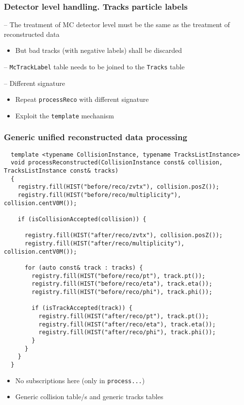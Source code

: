 \documentclass[14pt,aspectratio=169,t]{beamer}
\begin{document}
\begin{frame}[fragile]
  \frametitle{Detector level handling. Tracks particle labels}
  \vspace{0.1in}
  -- {\color{blue} The treatment of MC detector level must be the same as the treatment of reconstructed data}
  \begin{itemize}
    \small
    \item But bad tracks (with negative labels) shall be discarded
  \end{itemize}
  \vspace{0.1in}
  -- {\color{blue} \verb|McTrackLabel| table needs to be joined to the  \verb|Tracks| table}\par
  \vspace{0.1in}
  -- {\color{blue} Different signature}
  \begin{itemize}
    \small
    \item Repeat \verb|processReco| with different signature
    \item Exploit the \verb|template| mechanism
  \end{itemize}
\end{frame}

\begin{frame}[fragile]
  \frametitle{Generic unified reconstructed data processing}
  {\tiny\color{blue}
  \vspace{-0.1in}
  \begin{verbatim}
  template <typename CollisionInstance, typename TracksListInstance>
  void processReconstructed(CollisionInstance const& collision, TracksListInstance const& tracks)
  {
    registry.fill(HIST("before/reco/zvtx"), collision.posZ());
    registry.fill(HIST("before/reco/multiplicity"), collision.centV0M());

    if (isCollisionAccepted(collision)) {

      registry.fill(HIST("after/reco/zvtx"), collision.posZ());
      registry.fill(HIST("after/reco/multiplicity"), collision.centV0M());

      for (auto const& track : tracks) {
        registry.fill(HIST("before/reco/pt"), track.pt());
        registry.fill(HIST("before/reco/eta"), track.eta());
        registry.fill(HIST("before/reco/phi"), track.phi());

        if (isTrackAccepted(track)) {
          registry.fill(HIST("after/reco/pt"), track.pt());
          registry.fill(HIST("after/reco/eta"), track.eta());
          registry.fill(HIST("after/reco/phi"), track.phi());
        }
      }
    }
  }
  \end{verbatim}}
  \vspace{-0.3in}
  \begin{itemize}
    \small
    \item No subscriptions here (only in \verb|process...|)
    \item Generic collision table/s and generic tracks tables
  \end{itemize}
\end{frame}
\end{document}
